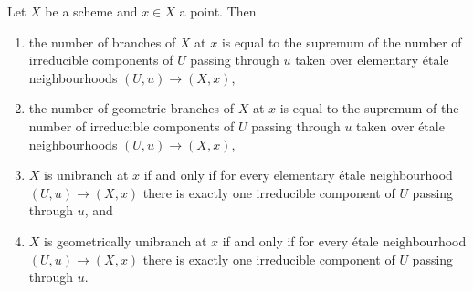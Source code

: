 \begin{lemma}
\label{lemma-nr-branches}
Let $X$ be a scheme and $x \in X$ a point. Then
\begin{enumerate}
\item the number of branches of $X$ at $x$ is equal to
the supremum of the number of irreducible components of $U$
passing through $u$ taken over elementary \'etale neighbourhoods
$(U, u) \to (X, x)$,
\item the number of geometric branches of $X$ at $x$ is equal to
the supremum of the number of irreducible components of $U$
passing through $u$ taken over \'etale neighbourhoods
$(U, u) \to (X, x)$,
\item $X$ is unibranch at $x$ if and only if for every
elementary \'etale neighbourhood $(U, u) \to (X, x)$ there
is exactly one irreducible component of $U$ passing through $u$, and
\item $X$ is geometrically unibranch at $x$ if and only if for every
\'etale neighbourhood $(U, u) \to (X, x)$ there
is exactly one irreducible component of $U$ passing through $u$.
\end{enumerate}
\end{lemma}

